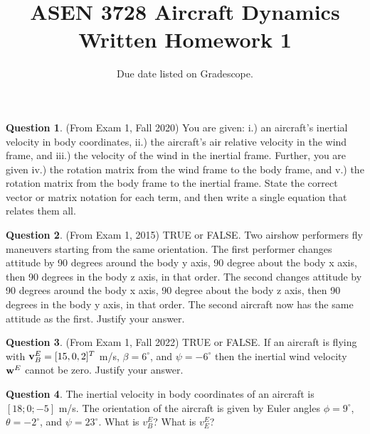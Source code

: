 \documentclass{article}
\title{ASEN 3728 Aircraft Dynamics\\Written Homework 1}
\date{Due date listed on Gradescope.}
\theoremstyle{definition}
\newtheorem{question}{Question}
\begin{document}
\maketitle

\begin{question}(From Exam 1, Fall 2020)
    You are given: i.) an aircraft’s inertial velocity in body coordinates, ii.) the aircraft’s air relative velocity in the wind frame, and iii.) the velocity of the wind in the inertial frame. Further, you are given iv.) the rotation matrix from the wind frame to the body frame, and v.) the rotation matrix from the body frame to the inertial frame. State the correct vector or matrix notation for each term, and then write a single equation that relates them all.
\end{question}

\vspace{6cm}

\begin{question}(From Exam 1, 2015)
    TRUE or FALSE. Two airshow performers fly maneuvers starting from the same orientation. The first performer changes attitude by 90 degrees around the body y axis, 90 degree about the body x axis, then 90 degrees in the body z axis, in that order. The second changes attitude by 90 degrees around the body x axis, 90 degree about the body z axis, then 90 degrees in the body y axis, in that order. The second aircraft now has the same attitude as the first.  Justify your answer.
\end{question}
\clearpage

\begin{question}(From Exam 1, Fall 2022)
    TRUE or FALSE. If an aircraft is flying with ${\bf v}^E_B = [15, 0, 2]^T$ m/s, $\beta = 6^{\circ}$, and $\psi = -6^{\circ}$ then the inertial wind velocity ${\bf w}^E$ cannot be zero.  Justify your answer.
\end{question}

\vspace{8cm}

\begin{question}
    The inertial velocity in body coordinates of an aircraft is $[18; 0; -5]$ m/s. The orientation of the aircraft is given by Euler angles $\phi = 9^{\circ}$, $\theta = -2^{\circ}$, and $\psi = 23^{\circ}$. What is $v_B^E$? What is $v_E^E$?
\end{question}
\end{document}
